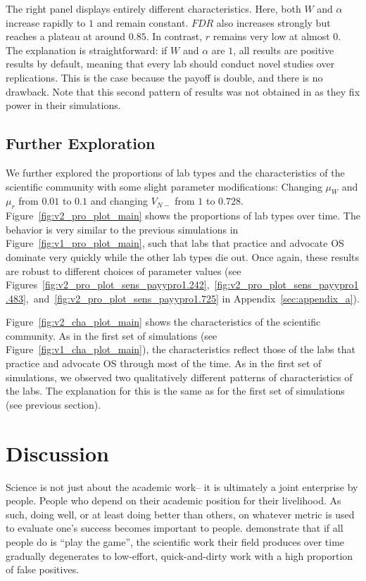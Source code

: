 \documentclass[meta, authordate]{jote-new-article}
\begin{document}
The right panel displays entirely different characteristics. Here, both $W$ and $\alpha$ increase rapidly to $1$ and remain constant. $FDR$ also increases strongly but reaches a plateau at around $0.85$. In contrast, $r$ remains very low at almost $0$. The explanation is straightforward: if $W$ and $\alpha$ are $1$, all results are positive results by default, meaning that every lab should conduct novel studies over replications. This is the case because the payoff is double, and there is no drawback. Note that this second pattern of results was not obtained in \textcite{KohrtSmaldinoMcelreath_2022preprint} as they fix power in their simulations.



\subsection{Further Exploration}

We further explored the proportions of lab types and the characteristics of the scientific community with some slight parameter modifications: Changing $\mu_W$ and $\mu_r$ from $0.01$ to $0.1$ and changing $V_{N-}$ from $1$ to $0.728$. Figure~\ref{fig:v2_pro_plot_main} shows the proportions of lab types over time. The behavior is very similar to the previous simulations in Figure~\ref{fig:v1_pro_plot_main}, such that labs that practice and advocate OS dominate very quickly while the other lab types die out. Once again, these results are robust to different choices of parameter values (see Figures~\ref{fig:v2_pro_plot_sens_payypro1.242},~\ref{fig:v2_pro_plot_sens_payypro1.483},~and~\ref{fig:v2_pro_plot_sens_payypro1.725} in Appendix~\ref{sec:appendix_a}).

Figure~\ref{fig:v2_cha_plot_main} shows the characteristics of the scientific community. As in the first set of simulations (see Figure~\ref{fig:v1_cha_plot_main}), the characteristics reflect those of the labs that practice and advocate OS through most of the time. As in the first set of simulations, we observed two qualitatively different patterns of characteristics of the labs. The explanation for this is the same as for the first set of simulations (see previous section).
%
%
%
%

\section{Discussion}

Science is not just about the academic work-- it is ultimately a joint enterprise by people. People who depend on their academic position for their livelihood. As such, doing well, or at least doing better than others, on whatever metric is used to evaluate one's success becomes important to people. \textcite{SmaldinoMcelreath2016} demonstrate that if all people do is ``play the game'', the scientific work their field produces over time gradually degenerates to low-effort, quick-and-dirty work with a high proportion of false positives.
\end{document}
